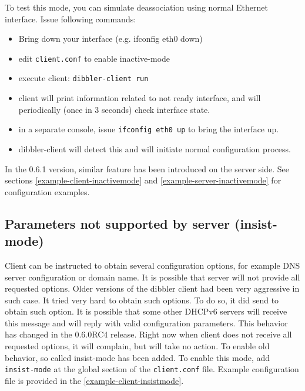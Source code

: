 To test this mode, you can simulate deassociation using normal
Ethernet interface. Issue following commands:

\begin{itemize}
\item Bring down your interface (e.g. ifconfig eth0 down)
\item edit \verb+client.conf+ to enable inactive-mode
\item execute client: \verb+dibbler-client run+
\item client will print information related to not ready interface,
  and will periodically (once in 3 seconds) check interface state.
\item in a separate console, issue \verb+ifconfig eth0 up+ to bring
  the interface up.
\item dibbler-client will detect this and will initiate normal
  configuration process.
\end{itemize}

In the 0.6.1 version, similar feature has been introduced on the
server side. See sections \ref{example-client-inactivemode} and
\ref{example-server-inactivemode} for configuration examples.

\subsection{Parameters not supported by server (insist-mode)}
\label{feature-insist-mode}

Client can be instructed to obtain several configuration options, for
example DNS server configuration or domain name. It is possible that
server will not provide all requested options. Older versions of the
dibbler client had been very aggressive in such case. It tried very
hard to obtain such options. To do so, it did send 
to obtain such option. It is possible that some other DHCPv6 servers
will receive this message and will reply with valid configuration
parameters. This behavior has changed in the 0.6.0RC4 release. Right
now when client does not receive all requested options, it will
complain, but will take no action. To enable old behavior, so called
insist-mode has been added. To enable this mode, add
\verb+insist-mode+ at the global section of the \verb+client.conf+
file. Example configuration file is provided in the
\ref{example-client-insistmode}.

